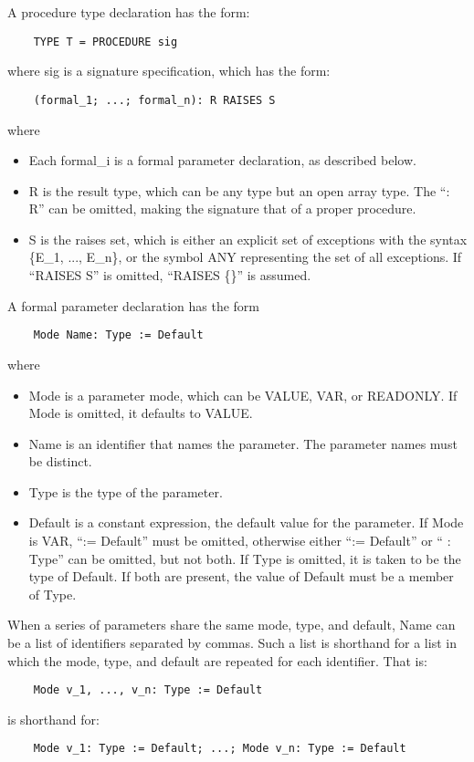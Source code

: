 \documentclass[10pt]{article}
\begin{document}
  A procedure type declaration has the form: 
\begin{verbatim}
    TYPE T = PROCEDURE sig
\end{verbatim}
 where sig is a signature specification, which has the form: 
\begin{verbatim}
    (formal_1; ...; formal_n): R RAISES S
\end{verbatim}
 where 
\begin{itemize}
\item  Each formal\_i is a formal parameter declaration, as described below. 
\item R is the result type, which can be any type but an open array type. The ``: R'' can be omitted, making the signature that of a proper procedure. 
\item S is the raises set, which is either an explicit set of exceptions with the syntax \{E\_1, ..., E\_n\}, or the symbol ANY representing the set of all exceptions. If ``RAISES S'' is omitted, ``RAISES \{\}'' is assumed. 
\end{itemize}



  A formal parameter declaration has the form 
\begin{verbatim}
    Mode Name: Type := Default
\end{verbatim}
 where
\begin{itemize}
\item Mode is a parameter mode, which can be VALUE, VAR, or READONLY. If Mode is omitted, it defaults to VALUE. 
\item Name is an identifier that names the parameter. The parameter names must be distinct. 
\item Type is the type of the parameter. 
\item Default is a constant expression, the default value for the parameter. If Mode is VAR, ``:= Default'' must be omitted, otherwise either ``:= Default'' or `` : Type'' can be omitted, but not both. If Type is omitted, it is taken to be the type of Default. If both are present, the value of Default must be a member of Type. 
\end{itemize}



  When a series of parameters share the same mode, type, and default, Name can be a list of identifiers separated by commas. Such a list is shorthand for a list in which the mode, type, and default are repeated for each identifier. That is: 
\begin{verbatim}
    Mode v_1, ..., v_n: Type := Default
\end{verbatim}
 is shorthand for: 
\begin{verbatim}
    Mode v_1: Type := Default; ...; Mode v_n: Type := Default
\end{verbatim}
\end{document}
